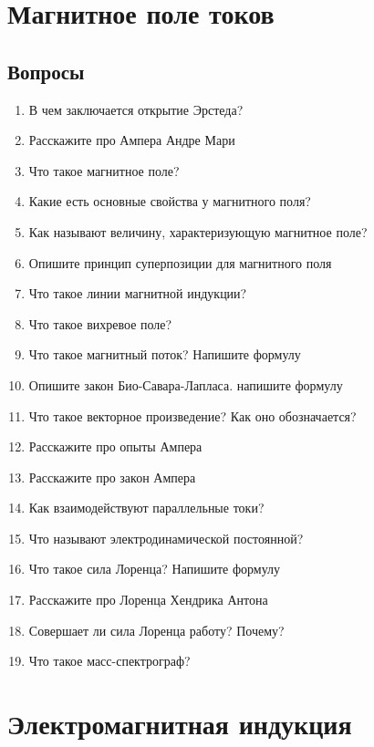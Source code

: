 \documentclass[12pt,a4paper]{report}
\begin{document}
\chapter{Магнитное поле токов}
\section{Вопросы}
\begin{enumerate}
\item В чем заключается открытие Эрстеда?
\item Расскажите про Ампера Андре Мари
\item Что такое магнитное поле?
\item Какие есть основные свойства у магнитного поля?
\item Как называют величину, характеризующую магнитное поле?
\item Опишите принцип суперпозиции для магнитного поля
\item Что такое линии магнитной индукции?
\item Что такое вихревое поле?
\item Что такое магнитный поток? Напишите формулу
\item Опишите закон Био-Савара-Лапласа. напишите формулу
\item Что такое векторное произведение? Как оно обозначается?
\item Расскажите про опыты Ампера
\item Расскажите про закон Ампера
\item Как взаимодействуют параллельные токи?
\item Что называют электродинамической постоянной?
\item Что такое сила Лоренца? Напишите формулу
\item Расскажите про Лоренца Хендрика Антона
\item Совершает ли сила Лоренца работу? Почему?
\item Что такое масс-спектрограф?
\end{enumerate}

\chapter{Электромагнитная индукция}
\end{document}
